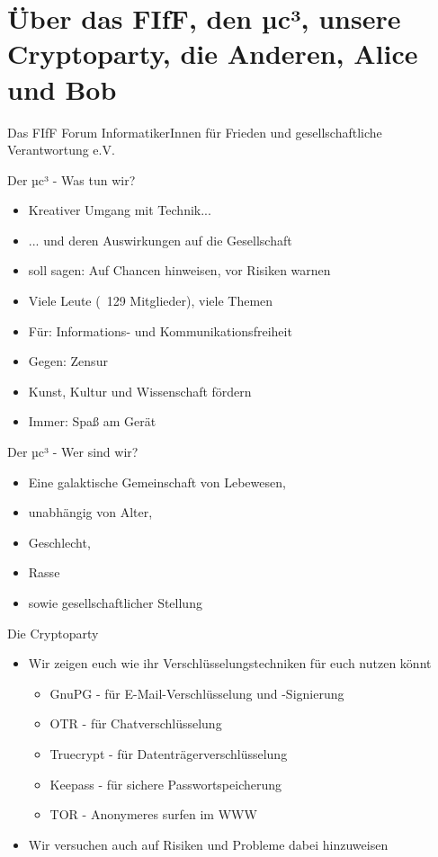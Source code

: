 \section{Über das FIfF, den µc³, unsere Cryptoparty, die Anderen, Alice und Bob}
  \begin{frame}{Das FIfF}
    Forum InformatikerInnen für Frieden und gesellschaftliche Verantwortung e.V.
  \end{frame}
  \begin{frame}{Der µc³ - Was tun wir?}
    \begin{itemize}
      \item{Kreativer Umgang mit Technik...}
      \item{... und deren Auswirkungen auf die Gesellschaft}
      \item{soll sagen: Auf Chancen hinweisen, vor Risiken warnen}
      \item{Viele Leute (~129 Mitglieder), viele Themen}
      \item{Für: Informations- und Kommunikationsfreiheit}
      \item{Gegen: Zensur}
      \item{Kunst, Kultur und Wissenschaft fördern}
      \item{Immer: Spaß am Gerät}
    \end{itemize}
  \end{frame}
  \begin{frame}{Der µc³ - Wer sind wir?}
    \begin{itemize}
      \item{Eine galaktische Gemeinschaft von Lebewesen,}
      \item{unabhängig von Alter,}
      \item{Geschlecht,}
      \item{Rasse}
      \item{sowie gesellschaftlicher Stellung}
    \end{itemize}
  \end{frame}
  \begin{frame}{Die Cryptoparty}
    \begin{itemize}
      \item{Wir zeigen euch wie ihr Verschlüsselungstechniken für euch nutzen könnt}
      \begin{itemize}
         \item{GnuPG - für E-Mail-Verschlüsselung und -Signierung}
         \item{OTR - für Chatverschlüsselung}
         \item{Truecrypt - für Datenträgerverschlüsselung}
         \item{Keepass - für sichere Passwortspeicherung}
         \item{TOR - Anonymeres surfen im WWW}
      \end{itemize}
      \item{Wir versuchen auch auf Risiken und Probleme dabei hinzuweisen}
    \end{itemize}
  \end{frame}
